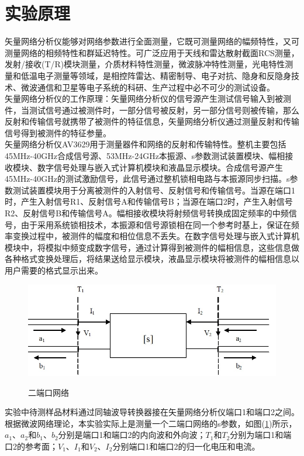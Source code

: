\documentclass[a4paper]{article}
\begin{document}
\section{实验原理}
矢量网络分析仪能够对网络参数进行全面测量，它既可测量网络的幅频特性，又可测量网络的相频特性和群延迟特性。可广泛应用于天线和雷达散射截面RCS测量，发射/接收(T/R)模块测量，介质材料特性测量，微波脉冲特性测量，光电特性测量和低温电子测量等领域，是相控阵雷达、精密制导、电子对抗、隐身和反隐身技术、微波通信和卫星等电子系统的科研、生产过程中必不可少的测试设备。\\
矢量网络分析仪的工作原理：矢量网络分析仪的信号源产生测试信号输入到被测件，当测试信号通过被测件时，一部分信号被反射，另一部分信号则被传输，那么反射和传输信号就携带了被测件的特征信息，矢量网络分析仪通过测量反射和传输信号得到被测件的特征参量。\\
矢量网络分析仪AV3629用于测量器件和网络的反射和传输特性。整机主要包括45MHz-40GHz合成信号源、53MHz-24GHz本振源、s参数测试装置模块、幅相接收模块、数字信号处理与嵌入式计算机模块和液晶显示模块。合成信号源产生45MHz-40GHz的测试激励信号，此信号通过整机锁相电路与本振源同步扫描。s参数测试装置模块用于分离被测件的入射信号、反射信号和传输信号。当源在端口1时，产生入射信号R1、反射信号A和传输信号B；当源在端口2时，产生入射信号R2、反射信号B和传输信号A。幅相接收模块将射频信号转换成固定频率的中频信号，由于采用系统锁相技术，本振源和信号源锁相在同一个参考时基上，保证在频率变换过程中，被测件的幅度和相位信息不丢失。在数字信号处理与嵌入式计算机模块中，将模拟中频变成数字信号，通过计算得到被测件的幅相信息，这些信息做各种格式变换处理后，将结果送给显示模块，液晶显示模块将被测件的幅相信息以用户需要的格式显示出来。\\
\begin{figure}[!h]
\centering
\includegraphics[width=12cm]{fig/2port.jpg}\\
\caption{二端口网络}\label{2port}
\end{figure}
实验中待测样品材料通过同轴波导转换器接在矢量网络分析仪端口1和端口2之间。根据微波网络理论，本实验实际上是测量一个二端口网络的s参数，如图(\ref{2port})所示，$a_1$、$a_2$和$b_1$、$b_2$分别是端口1和端口2的内向波和外向波；$T_1$和$T_2$分别为端口1和端口2的参考面；$V_1$、$I_1$和$V_2$、$I_2$分别端口1和端口2的归一化电压和电流。\\
\end{document}
